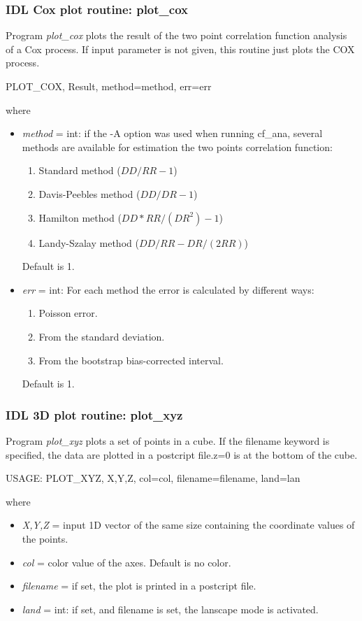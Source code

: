 \subsubsection{IDL Cox plot routine: plot\_cox}
Program {\em plot\_cox} plots the result of the two point correlation
function analysis of a Cox process. If input parameter is not given,
this routine just plots the COX process.
\begin{center}
PLOT\_COX, Result, method=method, err=err
\end{center}
where
\begin{itemize}
\item {\em method }= int: if the -A option was used when running cf\_ana,
several methods are available for estimation the two points correlation function:
\begin{enumerate}
\item Standard method ($DD/RR-1$)  
\item Davis-Peebles method ($DD/DR-1$) 
\item Hamilton method ($DD*RR/(DR^2) - 1$) 
\item Landy-Szalay method ($DD/RR - DR/(2RR)$)  
\end{enumerate}
Default is 1.

\item {\em err }= int: For each method the error is calculated by different
ways:
\begin{enumerate}
\item Poisson error.
\item From the standard deviation.
\item From the bootstrap bias-corrected interval.
\end{enumerate}
Default is 1.
\end{itemize}


\subsubsection{IDL 3D plot routine: plot\_xyz}
Program {\em plot\_xyz} plots a set of points in a cube.  If the
filename keyword is specified, the data are plotted in a postcript
file.z=0 is at the bottom of the cube.
\begin{center}
  USAGE: PLOT\_XYZ, X,Y,Z, col=col, filename=filename, land=lan
\end{center}
where
\begin{itemize}
\item {\em X,Y,Z} = input 1D vector of the same size containing the
  coordinate values of the points.
\item {\em  col } =  color value of the axes. Default is no color.
\item {\em filename} = if set, the plot is printed in a postcript
  file.
\item {\em land }= int: if set, and filename is set, the lanscape
  mode is activated.
\end{itemize}

